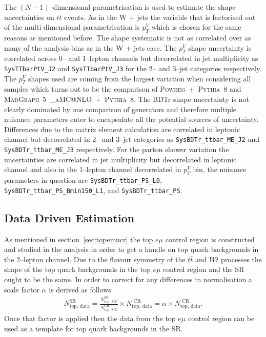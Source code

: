 The $(N-1)$--dimensional parametrisation is used to estimate the shape
uncertainties on $t\bar{t}$ events. As in the W + jets the variable that is
factorised out of the multi-dimensional parametrisation is $p_T^V$ which is
chosen for the same reasons as mentioned before. The shape systematic is not as
correlated over as many of the analysis bins as in the W + jets case. The
$p_T^V$ shape uncertainty is correlated across 0-- and 1--lepton channels but
decorrelated in jet multiplicity as \texttt{SysTTbarPtV\_J2} and
\texttt{SysTTbarPtV\_J3} for the 2-- and 3--jet categories respectively. The
$p_T^V$ shapes used are coming from the largest variation when considering all
samples which turns out to be the comparison of
\textsc{Powheg}~+~\textsc{Pythia}~8 and
\textsc{MadGraph}~5~\textsc{\_aMC@NLO}~+~\textsc{Pythia}~8. The BDTr shape
uncertainty is not clearly dominated by one comparison of generators and
therefore multiple nuisance parameters enter to encapsulate all the potential
sources of uncertainty. Differences due to the matrix element calculation are
correlated in leptonic channel but decorrelated in 2-- and 3--jet categories as
\texttt{SysBDTr\_ttbar\_ME\_J2} and \texttt{SysBDTr\_ttbar\_ME\_J3}
respectively. For the parton shower variation the uncertainties are correlated
in jet multiplicity but decorrelated in leptonic channel and also in the
1--lepton channel decorrelated in $p_T^V$ bin, the nuisance parameters in
question are \texttt{SysBDTr\_ttbar\_PS\_L0},
\texttt{SysBDTr\_ttbar\_PS\_Bmin150\_L1}, and \texttt{SysBDTr\_ttbar\_PS}.

\subsection{Data Driven Estimation}
\label{sec:ttbar_DD}

As mentioned in section~\ref{sec:topemucr} the top $e\mu$ control region is
constructed and studied in the analysis in order to get a handle on top quark
backgrounds in the 2--lepton channel. Due to the flavour symmetry of the
$t\bar{t}$ and $Wt$ processes the shape of the top quark backgrounds in the top
$e\mu$ control region and the SR ought to be the same. In order to correct for
any differences in normalisation a scale factor $\alpha$ is derived as follows
\begin{align}
  N_{\text{top, data}}^{\text{SR}}
  =
  \frac{N_{\text{top, MC}}^{\text{SR}}}{N_{\text{top, MC}}^{\text{CR}}}
  \times
  N_{\text{top, data}}^{\text{ CR}}
  = \alpha \times N_{\text{top, data}}^{\text{ CR}}.
  \label{eq:TTbar_DD_ExtrapFac}
\end{align}
Once that factor is applied then the data from the top $e\mu$ control region can
be used as a template for top quark backgrounds in the SR.


